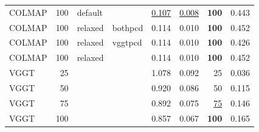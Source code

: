 \begin{table}[H]
\begin{tabular}{lrllrrrr}
COLMAP & 100 & default &  & \underline{0.107} & \underline{0.008} & \textbf{100} & 0.443 \\
COLMAP & 100 & relaxed & bothpcd & 0.114 & 0.010 & \textbf{100} & 0.452 \\
COLMAP & 100 & relaxed & vggtpcd & 0.114 & 0.010 & \textbf{100} & 0.426 \\
COLMAP & 100 & relaxed &  & 0.114 & 0.010 & \textbf{100} & 0.452 \\
VGGT & 25 &  &  & 1.078 & 0.092 & 25 & 0.036 \\
VGGT & 50 &  &  & 0.920 & 0.086 & 50 & 0.115 \\
VGGT & 75 &  &  & 0.892 & 0.075 & \underline{75} & 0.146 \\
VGGT & 100 &  &  & 0.857 & 0.067 & \textbf{100} & 0.165 \\
\bottomrule
\end{tabular}
\end{table}
